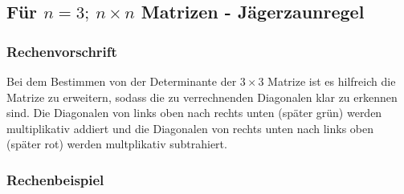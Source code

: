 \subsection{Für $n = 3 ;\ n\times n$ Matrizen - Jägerzaunregel}

\subsubsection{Rechenvorschrift}
Bei dem Bestimmen von der Determinante der $3\times 3$ Matrize ist es hilfreich die Matrize zu erweitern, sodass die zu verrechnenden Diagonalen
klar zu erkennen sind. Die Diagonalen von links oben nach rechts unten (später grün) werden multiplikativ addiert und die Diagonalen von rechts unten nach links
oben (später rot) werden multplikativ subtrahiert.

\subsubsection{Rechenbeispiel}

